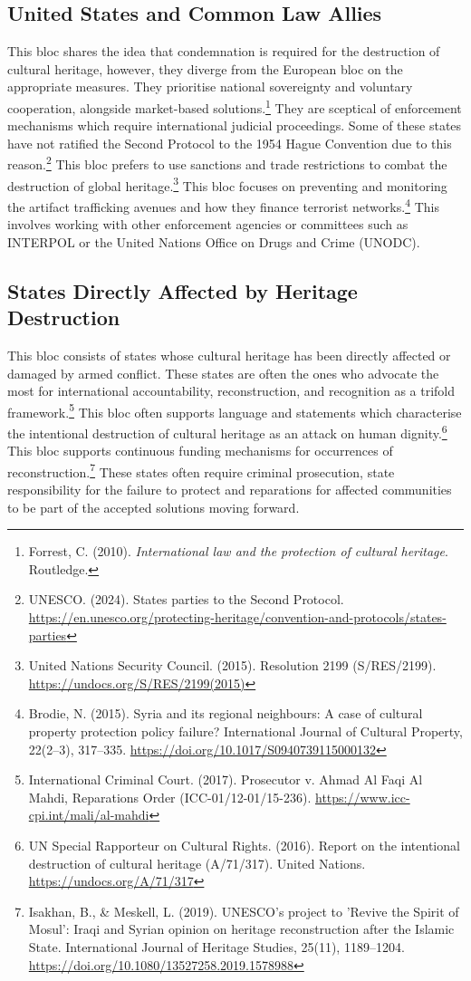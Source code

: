 \subsection{United States and Common Law Allies}

This bloc shares the idea that condemnation is required for the destruction of cultural heritage, however, they diverge from the European bloc on the appropriate measures. They prioritise national sovereignty and voluntary cooperation, alongside market-based solutions.\footnote{Forrest, C. (2010). \emph{International law and the protection of cultural heritage}. Routledge.} They are sceptical of enforcement mechanisms which require international judicial proceedings. Some of these states have not ratified the Second Protocol to the 1954 Hague Convention due to this reason.\footnote{UNESCO. (2024). States parties to the Second Protocol. \url{https://en.unesco.org/protecting-heritage/convention-and-protocols/states-parties}} This bloc prefers to use sanctions and trade restrictions to combat the destruction of global heritage.\footnote{United Nations Security Council. (2015). Resolution 2199 (S/RES/2199). \url{https://undocs.org/S/RES/2199(2015)}} This bloc focuses on preventing and monitoring the artifact trafficking avenues and how they finance terrorist networks.\footnote{Brodie, N. (2015). Syria and its regional neighbours: A case of cultural property protection policy failure? International Journal of Cultural Property, 22(2–3), 317–335. \url{https://doi.org/10.1017/S0940739115000132}} This involves working with other enforcement agencies or committees such as INTERPOL or the United Nations Office on Drugs and Crime (UNODC).

\subsection{States Directly Affected by Heritage Destruction}

This bloc consists of states whose cultural heritage has been directly affected or damaged by armed conflict. These states are often the ones who advocate the most for international accountability, reconstruction, and recognition as a trifold framework.\footnote{International Criminal Court. (2017). Prosecutor v. Ahmad Al Faqi Al Mahdi, Reparations Order (ICC-01/12-01/15-236). \url{https://www.icc-cpi.int/mali/al-mahdi}} This bloc often supports language and statements which characterise the intentional destruction of cultural heritage as an attack on human dignity.\footnote{UN Special Rapporteur on Cultural Rights. (2016). Report on the intentional destruction of cultural heritage (A/71/317). United Nations. \url{https://undocs.org/A/71/317}} This bloc supports continuous funding mechanisms for occurrences of reconstruction.\footnote{Isakhan, B., \& Meskell, L. (2019). UNESCO's project to 'Revive the Spirit of Mosul': Iraqi and Syrian opinion on heritage reconstruction after the Islamic State. International Journal of Heritage Studies, 25(11), 1189–1204. \url{https://doi.org/10.1080/13527258.2019.1578988}} These states often require criminal prosecution, state responsibility for the failure to protect and reparations for affected communities to be part of the accepted solutions moving forward.

